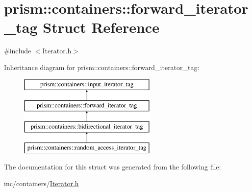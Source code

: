 \hypertarget{structprism_1_1containers_1_1forward__iterator__tag}{}\section{prism\+:\+:containers\+:\+:forward\+\_\+iterator\+\_\+tag Struct Reference}
\label{structprism_1_1containers_1_1forward__iterator__tag}


{\ttfamily \#include $<$Iterator.\+h$>$}

Inheritance diagram for prism\+:\+:containers\+:\+:forward\+\_\+iterator\+\_\+tag\+:\begin{figure}[H]
\begin{center}
\leavevmode
\includegraphics[height=4.000000cm]{structprism_1_1containers_1_1forward__iterator__tag}
\end{center}
\end{figure}


The documentation for this struct was generated from the following file\+:\begin{DoxyCompactItemize}
\item 
inc/containers/\hyperlink{_iterator_8h}{Iterator.\+h}\end{DoxyCompactItemize}
